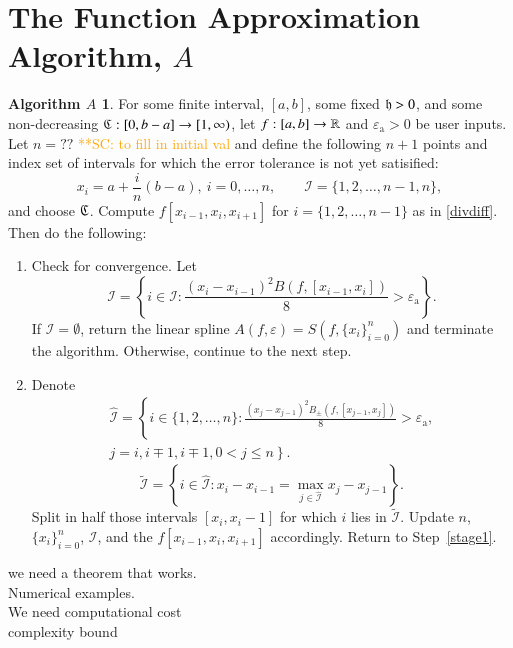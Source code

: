 \documentclass[review]{elsarticle}
\newcommand{\abstol}{\varepsilon_{\textrm{a}}}
\theoremstyle{definition}
\newtheorem*{algoA}{Algorithm $A$}
\newcommand{\scnote}[1]{ {\textcolor{orange}  {\mbox{**SC:} #1}}}
\begin{document}
\section{The Function Approximation Algorithm, $A$}\label{sec:fappx}

\begin{algoA}
For some finite interval, $[a,b]$, some fixed $\mathfrak{h} >0$, and some non-decreasing
$\mathfrak{C}:[0,b-a] \to [1, \infty)$, let $f:[a,b] \to \mathbb{R}$ and $\abstol >0$ be
user inputs. Let $n = ??$ \scnote{to fill in initial val} and define the
following $n+1$ points and index set of intervals for which the error tolerance
is not yet satisified: $$x_i=a+\frac{i}{n}(b-a), \ i=0,\ldots,n, \qquad
\mathcal{I} = \{1,2,\ldots,n-1,n\},$$ and choose $\mathfrak{C}$. Compute $f[x_{i-1},
x_{i}, x_{i+1}]$ for $i = \{1,2,\ldots,n-1\}$ as in \eqref{divdiff}. Then do the
following:
\begin{enumerate}[\hspace{8.5ex}]
\renewcommand{\labelenumi}{\textbf{Step \arabic{enumi}.}}
\item \label{stage1} Check for convergence.
Let
\[
\mathcal{I} = \left\{i \in \mathcal{I}: \frac{(x_i - x_{i-1})^2B(f,[x_{i-1},x_i])}{8}  > \abstol \right\}.
\]
If $\mathcal{I} = \emptyset$, return the linear spline $A(f,\varepsilon) = S(f, \{x_i\}_{i=0}^n)$ and terminate the algorithm.
Otherwise, continue to the next step.
\item \label{stage2} 
Denote
\begin{multline*}
\widehat{\mathcal{I}} = \left\{i \in \{1,2,\ldots,n\}: \frac{(x_j - x_{j-1})^2B_\pm(f,[x_{j-1},x_j])}{8}  > \abstol,\right.\\
 \left.j=i, i\mp1, i\mp1, 0<j\le n \right\}.
\end{multline*}
\[\widetilde{\mathcal{I}}=\left\{i \in \widehat{\mathcal{I}}: x_i - x_{i-1}=\max\limits_{j \in\widehat{\mathcal{I}} } x_j-x_{j-1} \right\}.\]
Split in half those intervals $[x_i,x_i-1]$ for which $i$ lies in $\widetilde{\mathcal{I}}$.
Update $n$, $\{x_i\}_{i=0}^n$, $\mathcal{I}$, and the $f[x_{i-1}, x_{i}, x_{i+1}]$ accordingly.  Return to Step~\ref{stage1}.
\end{enumerate}
\end{algoA}

we need a theorem that works.\\

Numerical examples.\\
We need computational cost\\
complexity bound \\
\end{document}
